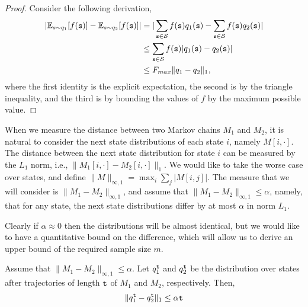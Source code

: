 \begin{proof} Consider the following derivation,
\begin{align*} |\mathbb{E}_{s\sim q_1}[f({\tt s})]- \mathbb{E}_{s\sim q_2}[f({\tt s})]|
&=|\sum_{{\tt s} \in \mathcal{S}} f({\tt s})q_1({\tt s}) - \sum_{{\tt s} \in \mathcal{S}} f({\tt s})q_2({\tt s})| \\
&\leq \sum_{{\tt s} \in \mathcal{S}} f({\tt s})|q_1({\tt s}) - q_2({\tt s})|\\
 &\leq F_{max} \|q_1-q_2\|_1,
\end{align*}
where the first identity is the explicit expectation, the second is by the triangle inequality, and the third is by bounding the values of $f$ by the maximum possible value.
\end{proof}

When we measure the distance between two Markov chains $M_1$ and
$M_2$, it is natural to consider the next state distributions of
each state $i$, namely $M[i,\cdot]$. The distance between the next state distribution for state $i$
can be measured by the $L_1$ norm, i.e., $\|
M_1[i,\cdot]-M_2[i,\cdot]\|_1 $. We would like to take the worse
case over states, and define $\|M\|_{\infty,1} = \max_i \sum_j
|M[i,j]|$. The measure that we will consider is
$\|M_1-M_2\|_{\infty,1}$, and assume that
$\|M_1-M_2\|_{\infty,1}\leq \alpha$, namely, that for any state, the
next state distributions differ by at most $\alpha$ in norm $L_1$.



Clearly if $\alpha\approx 0$ then the distributions will be almost
identical, but we would like to have a quantitative bound on the
difference, which will allow us to derive an upper bound of the
required sample size $m$.



\begin{theorem}
\label{thm:l1-error}
%
Assume that $\|M_1-M_2\|_{\infty,1}\leq \alpha$.
%
Let $q_1^{\tt t}$ and $q_2^{\tt t}$ be the distribution over states
after trajectories  of length ${\tt t}$ of $M_1$ and $M_2$,
respectively. Then,
\[
\|q_1^{\tt t}-q_2^{\tt t}\|_1\leq \alpha  {\tt t}
\]
\end{theorem}

